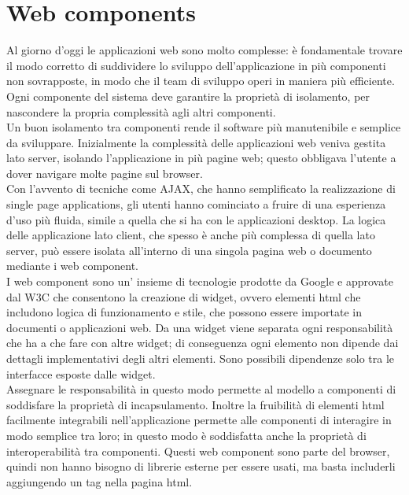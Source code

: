 \section{Web components}
\label{sec:chapter_tecnologie_abilitanti_webcomp_poly}

Al giorno d’oggi le applicazioni web sono molto complesse: è fondamentale trovare il modo corretto di suddividere lo sviluppo dell’applicazione in più componenti non sovrapposte, in modo che il team di sviluppo operi in maniera più efficiente. 
Ogni componente del sistema deve garantire la proprietà di isolamento, per nascondere la propria complessità agli altri componenti.
\\
Un buon isolamento tra componenti rende il software più manutenibile e semplice da sviluppare.
Inizialmente la complessità delle applicazioni web veniva gestita lato server, isolando l’applicazione in più pagine web; questo obbligava l’utente a dover navigare molte pagine sul browser.
\\
Con l’avvento di tecniche come AJAX, che hanno semplificato la realizzazione di single page applications, gli utenti hanno cominciato a fruire di una esperienza d’uso più fluida, simile a quella che si ha con le applicazioni desktop. 
La logica delle applicazione lato client, che spesso è anche più complessa di quella lato server, può essere isolata all’interno di una singola pagina web o documento mediante i web component.
\\
I web component sono un’ insieme di tecnologie prodotte da  Google e approvate dal W3C che consentono la creazione di widget, ovvero elementi html che includono logica di funzionamento e stile, che possono essere importate in documenti o applicazioni web. Da una widget viene separata ogni responsabilità che ha a che fare con altre widget; di conseguenza ogni elemento non dipende dai dettagli implementativi degli altri elementi. Sono possibili dipendenze solo tra le interfacce esposte dalle widget. \cite{web_comp1}
\\ 
Assegnare le responsabilità in questo modo permette al modello a componenti di soddisfare la proprietà di incapsulamento.
Inoltre la fruibilità di elementi html facilmente integrabili nell’applicazione permette alle componenti di interagire in modo semplice tra loro; in questo modo è soddisfatta anche la proprietà di interoperabilità tra componenti.
Questi web component sono parte del browser, quindi non hanno bisogno di librerie esterne per essere usati, ma basta includerli aggiungendo un tag nella pagina html.
\\ 
